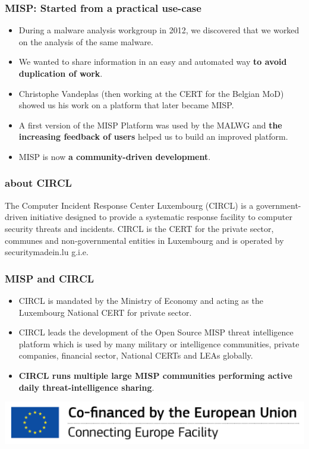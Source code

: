 
\begin{frame}[t,plain]
\titlepage
\end{frame}

\begin{frame}
 \frametitle{MISP: Started from a practical use-case}
 \begin{itemize}
         \item During a malware analysis workgroup in 2012, we discovered that we worked on the analysis of the same malware.
         \item We wanted to share information in an easy and automated way {\bf to avoid duplication of work}.
         \item Christophe Vandeplas (then working at the CERT for the Belgian MoD) showed us his work on a platform that later became MISP.
         \item A first version of the MISP Platform was used by the MALWG and {\bf the increasing feedback of users} helped us to build an improved platform.
         \item MISP is now {\bf a community-driven development}.
 \end{itemize}
\end{frame}

\begin{frame}
\frametitle{about CIRCL}
The Computer Incident Response Center Luxembourg (CIRCL) is a government-driven initiative designed to provide a systematic response facility to computer security threats and incidents. CIRCL is the CERT for the private sector, communes and non-governmental entities in Luxembourg and is operated by securitymadein.lu g.i.e.
\end{frame}

\begin{frame}
\frametitle{MISP and CIRCL}
\begin{itemize}
\item CIRCL is mandated by the Ministry of Economy and acting as the Luxembourg National CERT for private sector.
\item CIRCL leads the development of the Open Source MISP threat intelligence platform which is used by many military or intelligence communities, private companies, financial sector, National CERTs and LEAs globally.
\item {\bf CIRCL runs multiple large MISP communities performing active daily threat-intelligence sharing}.
\end{itemize}
        \includegraphics{en_cef.png}
\end{frame}

